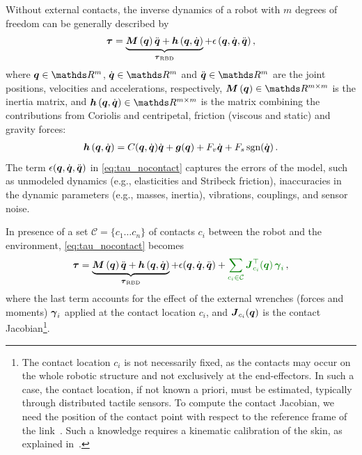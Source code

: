 

Without external contacts, the inverse dynamics of a robot with $m$ degrees of freedom can be generally described by 
%
\begin{align}
  \boldsymbol{\tau} = \underbrace{\boldsymbol M \left( \boldsymbol q \right)\ddot{\boldsymbol q} + \boldsymbol{h} \left(\boldsymbol q,\dot{\boldsymbol q} \right)}_{\boldsymbol{\tau}_\text{RBD}} + \epsilon\,(\boldsymbol q,\dot{\boldsymbol q},\ddot{\boldsymbol q}) \,,
  \label{eq:tau_nocontact}
\end{align}
%
where $\q\in \R^{m}$, $\dq \in \R^{m}$ and $\ddq \in \R^{m}$ are the joint positions, velocities and accelerations, respectively, $\inertiaMatrix \in \R^{m \times m}$ is the inertia matrix, and $\Hmatrix \in \R^{m \times m}$ is the matrix combining the contributions from Coriolis and centripetal, friction (viscous and static) and gravity forces:
%
\begin{align}
	\boldsymbol{h} \left(\boldsymbol q,\dot{\boldsymbol q} \right) = C(\boldsymbol q,\dot{\boldsymbol q})\dot{\boldsymbol q} + \boldsymbol{g}(\boldsymbol q) + F_v \dot{\boldsymbol q} + F_s \,\text{sgn}(\dot{\boldsymbol q}) \,.
\end{align}
%
The term $\epsilon(\boldsymbol q,\dot{\boldsymbol q},\ddot{\boldsymbol q})$ in \eq\eqref{eq:tau_nocontact} captures the errors of the model,
such as unmodeled dynamics (e.g., elasticities and Stribeck friction),
inaccuracies in the dynamic parameters (e.g., masses, inertia),
vibrations, couplings, and sensor noise. 

In presence of a set $\mathcal{C}=\{c_1 \ldots c_n\}$ of contacts $c_i$ between the robot and the environment, \eq\eqref{eq:tau_nocontact} becomes
%
\begin{align}
	\torques = \underbrace{\inertiaMatrix\ddq + \Hmatrix}_{\torques_\text{RBD}} + \epsilon(\q,\dq,\ddq) + \color{darkgreen}{\sum_{c_i \in\mathcal{C}} {\jacobian\T_{c_i}(\q)}\, \extForces_i} \,\color{black}{,}
	\label{eq:tau_contact}
\end{align}
%
where the last term accounts for the effect of the external wrenches
(forces and moments) $\boldsymbol{\gamma}_i$ applied at the
contact location $c_i$, and $\boldsymbol J_{c_i}(\boldsymbol q)$  is the contact Jacobian\footnote{The contact location $c_i$ is not necessarily fixed, as the contacts may occur on the whole robotic structure and not exclusively at the end-effectors. 
In such a case, the contact location, if not known a priori, must be estimated, typically through distributed tactile sensors.
To compute the contact Jacobian, we need the position of the contact point with respect to the reference frame of the link~\cite{Fumagalli2012}. 
Such a knowledge requires a kinematic calibration of the skin, as explained in~\cite{DelPrete2011}.}.
%


